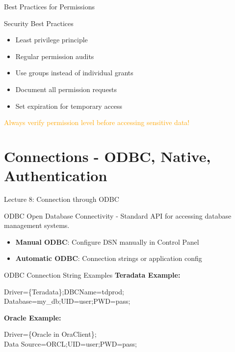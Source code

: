 \documentclass{beamer}
\begin{document}
	\begin{frame}{Best Practices for Permissions}
		\begin{block}{Security Best Practices}
			\begin{itemize}
				\item Least privilege principle
				\item Regular permission audits
				\item Use groups instead of individual grants
				\item Document all permission requests
				\item Set expiration for temporary access
			\end{itemize}
		\end{block}
		\begin{center}
			\textcolor{orange}{Always verify permission level before accessing sensitive data!}
		\end{center}
	\end{frame}
	
	\section{Connections - ODBC, Native, Authentication}
	
	\begin{frame}{Lecture 8: Connection through ODBC}
		\begin{definition}{ODBC}
			Open Database Connectivity - Standard API for accessing database management systems.
		\end{definition}
		\begin{itemize}
			\item \textbf{Manual ODBC}: Configure DSN manually in Control Panel
			\item \textbf{Automatic ODBC}: Connection strings or application config
		\end{itemize}
	\end{frame}
	
	\begin{frame}{ODBC Connection String Examples}
		\textbf{Teradata Example:}
		\begin{center}
			\color{blue}
			Driver=\{Teradata\};DBCName=tdprod;\\
			Database=my\_db;UID=user;PWD=pass;
			\color{black}
		\end{center}
		
		\textbf{Oracle Example:}
		\begin{center}
			\color{blue}
			Driver=\{Oracle in OraClient\};\\
			Data Source=ORCL;UID=user;PWD=pass;
			\color{black}
		\end{center}
	\end{frame}
	
\end{document}
